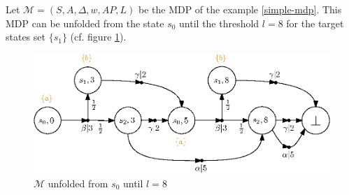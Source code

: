 \begin{example}
  Let $\mathcal{M} = (S, A, \Delta, w, AP, L)$ be the MDP of the example \ref{simple-mdp}.
  This MDP can be unfolded from the state $s_0$ until the threshold $l = 8$ for the target states set $\{s_1\}$ (cf. figure \ref{unfolding}).
  \begin{figure}[h!]
    \centering
    \includegraphics[width=0.8\linewidth]{resources/unfolding}
    \caption{$\mathcal{M}$ unfolded from $s_0$ until $l=8$}\label{unfolding}
  \end{figure}
\end{example}
